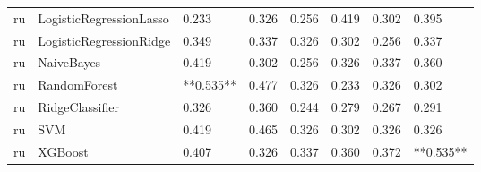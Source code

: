 \begin{tabular}{llllllll}
      ru &      LogisticRegressionLasso &     0.233 &                     0.326 &                 0.256 &                  0.419 &                                   0.302 &     0.395 \\
      ru &      LogisticRegressionRidge &     0.349 &                     0.337 &                 0.326 &                  0.302 &                                   0.256 &     0.337 \\
      ru &                   NaiveBayes &     0.419 &                     0.302 &                 0.256 &                  0.326 &                                   0.337 &     0.360 \\
      ru &                 RandomForest & **0.535** &                     0.477 &                 0.326 &                  0.233 &                                   0.326 &     0.302 \\
      ru &              RidgeClassifier &     0.326 &                     0.360 &                 0.244 &                  0.279 &                                   0.267 &     0.291 \\
      ru &                          SVM &     0.419 &                     0.465 &                 0.326 &                  0.302 &                                   0.326 &     0.326 \\
      ru &                      XGBoost &     0.407 &                     0.326 &                 0.337 &                  0.360 &                                   0.372 & **0.535** \\
\bottomrule
\end{tabular}
